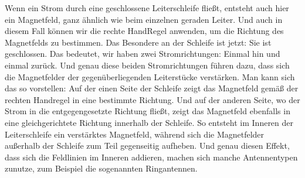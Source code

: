 \begin{frame}
{	Wenn ein Strom durch eine geschlossene Leiterschleife fließt, entsteht auch hier ein Magnetfeld, ganz ähnlich wie beim einzelnen geraden Leiter.
	Und auch in diesem Fall können wir die rechte HandRegel anwenden, um die Richtung des Magnetfelds zu bestimmen.
	Das Besondere an der Schleife ist jetzt: Sie ist geschlossen.
	Das bedeutet, wir haben zwei Stromrichtungen: Einmal hin und einmal zurück.
	Und genau diese beiden Stromrichtungen führen dazu, dass sich die Magnetfelder der gegenüberliegenden Leiterstücke verstärken.
	Man kann sich das so vorstellen: Auf der einen Seite der Schleife zeigt das Magnetfeld gemäß der rechten Handregel in eine bestimmte Richtung.
	Und auf der anderen Seite, wo der Strom in die entgegengesetzte Richtung fließt, zeigt das Magnetfeld ebenfalls in eine gleichgerichtete Richtung innerhalb der Schleife.
	So entsteht im Inneren der Leiterschleife ein verstärktes Magnetfeld, während sich die Magnetfelder außerhalb der Schleife zum Teil gegenseitig aufheben.
	Und genau diesen Effekt, dass sich die Feldlinien im Inneren addieren, machen sich manche Antennentypen zunutze, zum Beispiel die sogenannten Ringantennen.
}
\end{frame}

